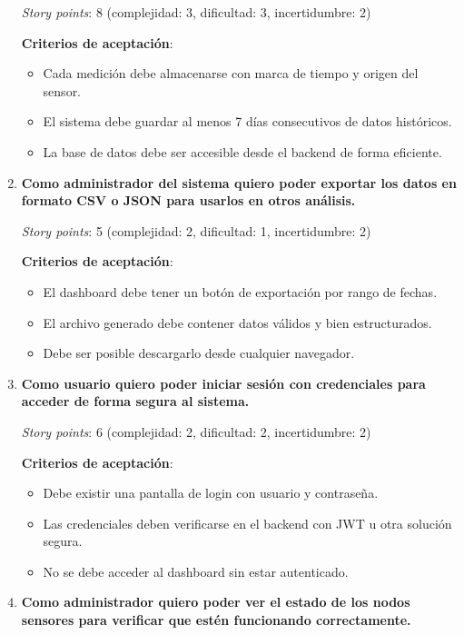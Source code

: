\documentclass[
11pt, %
]{charter}
\begin{document}
\begin{enumerate}
    \textit{Story points}: 8 (complejidad: 3, dificultad: 3, incertidumbre: 2)

    \textbf{Criterios de aceptación}:
    \begin{itemize}
        \item Cada medición debe almacenarse con marca de tiempo y origen del sensor.
        \item El sistema debe guardar al menos 7 días consecutivos de datos históricos.
        \item La base de datos debe ser accesible desde el backend de forma eficiente.
    \end{itemize}

    \item \textbf{Como administrador del sistema quiero poder exportar los datos en formato CSV o JSON para usarlos en otros análisis.}

    \textit{Story points}: 5 (complejidad: 2, dificultad: 1, incertidumbre: 2)

    \textbf{Criterios de aceptación}:
    \begin{itemize}
        \item El dashboard debe tener un botón de exportación por rango de fechas.
        \item El archivo generado debe contener datos válidos y bien estructurados.
        \item Debe ser posible descargarlo desde cualquier navegador.
    \end{itemize}

    \item \textbf{Como usuario quiero poder iniciar sesión con credenciales para acceder de forma segura al sistema.}

    \textit{Story points}: 6 (complejidad: 2, dificultad: 2, incertidumbre: 2)

    \textbf{Criterios de aceptación}:
    \begin{itemize}
        \item Debe existir una pantalla de login con usuario y contraseña.
        \item Las credenciales deben verificarse en el backend con JWT u otra solución segura.
        \item No se debe acceder al dashboard sin estar autenticado.
    \end{itemize}

    \item \textbf{Como administrador quiero poder ver el estado de los nodos sensores para verificar que estén funcionando correctamente.}


\end{enumerate}
\end{document}

